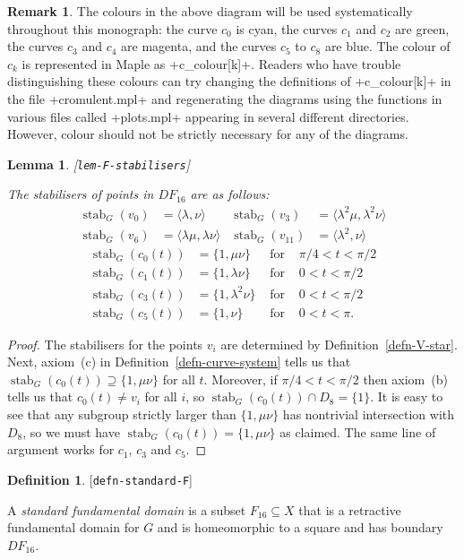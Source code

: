 \documentclass[reqno]{amsart}
\newcommand{\lbl}[1]{\label{#1}\textup{[\texttt{#1}]}\par}
\newcommand{\lbl}{\label}
\newcommand{\stab}	{\operatorname{stab}}
\newcommand{\lm}        {\lambda}
\newcommand{\ip}[1]     {\langle #1\rangle}
\newcommand{\sse}       {\subseteq}
\renewcommand{\:}{\colon}
\newtheorem{lemma}[theorem]{Lemma}
\theoremstyle{definition}
\newtheorem{remark}[theorem]{Remark}
\newtheorem{definition}[theorem]{Definition}
\begin{document}
\begin{remark}
 The colours in the above diagram will be used systematically
 throughout this monograph: the curve $c_0$ is cyan, the curves $c_1$
 and $c_2$ are green, the curves $c_3$ and $c_4$ are magenta, and the
 curves $c_5$ to $c_8$ are blue.  The colour of $c_k$ is represented
 in Maple as \mcode+c_colour[k]+.  Readers who have trouble
 distinguishing these colours can try changing the definitions of
 \mcode+c_colour[k]+ in the file \fname+cromulent.mpl+ and
 regenerating the diagrams using the functions in various files called
 \fname+plots.mpl+ appearing in several different directories.
 However, colour should not be strictly necessary for any of the
 diagrams. 
\end{remark}

\begin{lemma}\lbl{lem-F-stabilisers}
 The stabilisers of points in $DF_{16}$ are as follows:
 \begin{align*}
  \stab_G(v_0) &= \ip{\lm,\nu} &
  \stab_G(v_3) &= \ip{\lm^2\mu,\lm^2\nu} \\
  \stab_G(v_6) &= \ip{\lm\mu,\lm\nu} &
  \stab_G(v_{11}) &= \ip{\lm^2,\nu}
 \end{align*}
 \begin{align*}
  \stab_G(c_0(t)) &= \{1,\mu\nu\}   & \text{ for } & \pi/4<t<\pi/2 \\
  \stab_G(c_1(t)) &= \{1,\lm\nu\}   & \text{ for } & 0<t<\pi/2 \\
  \stab_G(c_3(t)) &= \{1,\lm^2\nu\} & \text{ for } & 0<t<\pi/2 \\
  \stab_G(c_5(t)) &= \{1,\nu\}      & \text{ for } & 0<t<\pi.
 \end{align*}
\end{lemma}
\begin{proof}
 The stabilisers for the points $v_i$ are determined by
 Definition~\ref{defn-V-star}.  Next, axiom~(c) in
 Definition~\ref{defn-curve-system} tells us that
 $\stab_G(c_0(t))\supseteq\{1,\mu\nu\}$ for all $t$.  Moreover, if
 $\pi/4<t<\pi/2$ then axiom~(b) tells us that $c_0(t)\neq v_i$ for all
 $i$, so $\stab_G(c_0(t))\cap D_8=\{1\}$.  It is easy to see that any
 subgroup strictly larger than $\{1,\mu\nu\}$ has nontrivial
 intersection with $D_8$, so we must have
 $\stab_G(c_0(t))=\{1,\mu\nu\}$ as claimed.  The same line of argument
 works for $c_1$, $c_3$ and $c_5$.
\end{proof}

\begin{definition}\lbl{defn-standard-F}
 A \emph{standard fundamental domain} is a subset $F_{16}\sse X$ that
 is a retractive fundamental domain for $G$ and is homeomorphic to a
 square and has boundary $DF_{16}$.
\end{definition}
\end{document}
